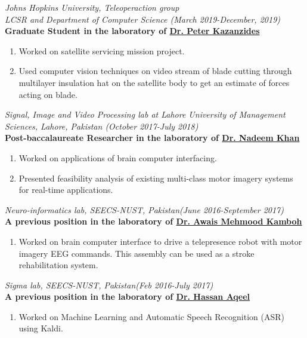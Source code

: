 \textit{Johns Hopkins University, Teleoperaction group}\\
\textit{LCSR and Department of Computer Science \hfill(March 2019-December, 2019)}\\
\textbf{\rmfamily Graduate Student in the laboratory of \ul{Dr. Peter Kazanzides}}

\begin{enumerate}
\item Worked on satellite servicing mission project. 
\item Used computer vision techniques on video stream of blade cutting through multilayer insulation hat on the satellite body to get an estimate of forces acting on blade.
\end{enumerate}

\textit{Signal, Image and Video Processing lab at Lahore University of Management Sciences, Lahore, Pakistan \hfill(October 2017-July 2018)}\\
\textbf{\rmfamily Post-baccalaureate Researcher in the laboratory of \ul{Dr. Nadeem Khan}}

\begin{enumerate}
\item Worked on applications of brain computer interfacing.
\item Presented feasibility analysis of existing multi-class motor imagery systems for real-time applications. 
\end{enumerate}

\textit{Neuro-informatics lab, SEECS-NUST, Pakistan\hfill(June 2016-September 2017)}\\
\textbf{\rmfamily A previous position in the laboratory of \ul{Dr. Awais Mehmood Kamboh}}

\begin{enumerate}
\item Worked on brain computer interface to drive a telepresence robot with motor imagery EEG commands. This assembly can be used as a stroke rehabilitation system.
\end{enumerate}

\textit{Sigma lab, SEECS-NUST, Pakistan\hfill(Feb 2016-July 2017)}\\
\textbf{\rmfamily A previous position in the laboratory of \ul{Dr. Hassan Aqeel}}

\begin{enumerate}
\item Worked on Machine Learning and Automatic Speech Recognition (ASR) using Kaldi.
\end{enumerate}


